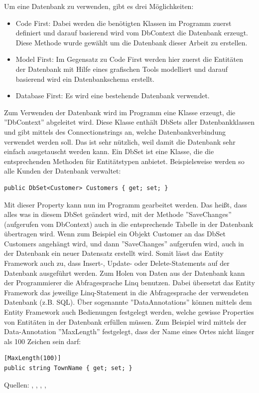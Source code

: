 Um eine Datenbank zu verwenden, gibt es drei Möglichkeiten:
\begin{itemize}
\item Code First: Dabei werden die benötigten Klassen im Programm zuerst definiert und darauf basierend wird vom DbContext die Datenbank erzeugt. Diese Methode wurde gewählt um die Datenbank dieser Arbeit zu erstellen.
\item Model First: Im Gegensatz zu Code First werden hier zuerst die Entitäten der Datenbank mit Hilfe eines grafischen Tools modelliert und darauf basierend wird ein Datenbankschema erstellt.
\item Database First: Es wird eine bestehende Datenbank verwendet.
\end{itemize}
Zum Verwenden der Datenbank wird im Programm eine Klasse erzeugt, die ''DbContext'' abgeleitet wird. Diese Klasse enthält DbSets aller Datenbankklassen und gibt mittels des Connectionstrings an, welche Datenbankverbindung verwendet werden soll. Das ist sehr nützlich, weil damit die Datenbank sehr einfach ausgetauscht werden kann. Ein DbSet ist eine Klasse, die die entsprechenden Methoden für Entitätstypen anbietet. Beispielsweise werden so alle Kunden der Datenbank verwaltet: 
\begin{lstlisting}
public DbSet<Customer> Customers { get; set; }
\end{lstlisting}
Mit dieser Property kann nun im Programm gearbeitet werden. Das heißt, dass alles was in diesem DbSet geändert wird, mit der Methode ''SaveChanges'' (aufgerufen vom  DbContext) auch in die entsprechende Tabelle in der Datenbank übertragen wird. Wenn zum Beispiel ein Objekt Customer an das DbSet Customers angehängt wird, und dann ''SaveChanges'' aufgerufen wird, auch in der Datenbank ein neuer Datensatz erstellt wird. Somit lässt das Entity Framework auch zu, dass Insert-, Update- oder Delete-Statements auf der Datenbank ausgeführt werden.
Zum Holen von Daten aus der Datenbank kann der Programmierer die Abfragesprache Linq benutzen. Dabei übersetzt das Entity Framework das jeweilige Linq-Statement in die Abfragesprache der verwendeten Datenbank (z.B. SQL). Über sogenannte ''DataAnnotations'' können mittels dem Entity Framework auch Bedienungen festgelegt werden, welche gewisse Properties von Entitäten in der Datenbank erfüllen müssen. Zum Beispiel wird mittels der Data-Annotation ''MaxLength'' festgelegt, dass der Name eines Ortes nicht länger als 100 Zeichen sein darf:
\begin{lstlisting}
[MaxLength(100)]
public string TownName { get; set; }
\end{lstlisting}
Quellen: \cite{wikipedia_entity_2017}, \cite{entityframework_tutorial_what_2018}, \cite{wikipedia_objektrelationale_2016}, \cite{microsoft_entity_connections_2018}, \cite{microsoft_entity_2018}
